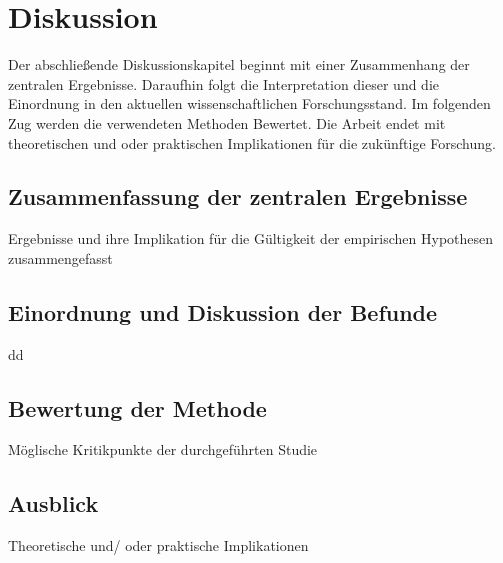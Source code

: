 \chapter{Diskussion}   \label{ch_5}
Der abschließende Diskussionskapitel beginnt mit einer Zusammenhang der zentralen Ergebnisse. Daraufhin folgt die Interpretation dieser und die Einordnung in den aktuellen wissenschaftlichen Forschungsstand. Im folgenden Zug werden die verwendeten Methoden Bewertet. Die Arbeit endet mit theoretischen und oder praktischen Implikationen für die zukünftige Forschung.


\section{Zusammenfassung der zentralen Ergebnisse}  \label{sec_5.1}
Ergebnisse und ihre Implikation für die Gültigkeit der empirischen Hypothesen zusammengefasst


\section{Einordnung und Diskussion der Befunde}     \label{sec_5.2}
dd


\section{Bewertung der Methode}
Möglische Kritikpunkte der durchgeführten Studie    \label{sec_5.3}


\section{Ausblick}
Theoretische und/ oder praktische Implikationen     \label{sec_5.4}